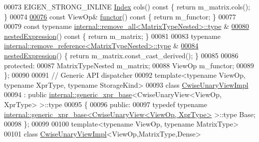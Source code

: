 \begin{DoxyCode}
00073     EIGEN\_STRONG\_INLINE \hyperlink{namespace_eigen_a62e77e0933482dafde8fe197d9a2cfde}{Index} cols()\textcolor{keyword}{ const }\{ \textcolor{keywordflow}{return} m\_matrix.cols(); \}
00074 
\hyperlink{group___core___module_af01271cdadcbcf195b5d3130ff2e1a48}{00076}     \textcolor{keyword}{const} ViewOp& \hyperlink{group___core___module_af01271cdadcbcf195b5d3130ff2e1a48}{functor}()\textcolor{keyword}{ const }\{ \textcolor{keywordflow}{return} m\_functor; \}
00077 
00079     \textcolor{keyword}{const} \textcolor{keyword}{typename} \hyperlink{group___sparse_core___module}{internal::remove\_all<MatrixTypeNested>::type}
      &
\hyperlink{group___core___module_a21d59e387e600b1d650cb002175760b4}{00080}     \hyperlink{group___core___module_a21d59e387e600b1d650cb002175760b4}{nestedExpression}()\textcolor{keyword}{ const }\{ \textcolor{keywordflow}{return} m\_matrix; \}
00081 
00083     \textcolor{keyword}{typename} \hyperlink{group___sparse_core___module}{internal::remove\_reference<MatrixTypeNested>::type}
      &
\hyperlink{group___core___module_add6689b53e595e968e89592ea30b6800}{00084}     \hyperlink{group___core___module_add6689b53e595e968e89592ea30b6800}{nestedExpression}() \{ \textcolor{keywordflow}{return} m\_matrix.const\_cast\_derived(); \}
00085 
00086   \textcolor{keyword}{protected}:
00087     MatrixTypeNested m\_matrix;
00088     ViewOp m\_functor;
00089 \};
00090 
00091 \textcolor{comment}{// Generic API dispatcher}
00092 \textcolor{keyword}{template}<\textcolor{keyword}{typename} ViewOp, \textcolor{keyword}{typename} XprType, \textcolor{keyword}{typename} StorageKind>
00093 \textcolor{keyword}{class }\hyperlink{class_eigen_1_1_cwise_unary_view_impl}{CwiseUnaryViewImpl}
00094   : \textcolor{keyword}{public} \hyperlink{struct_eigen_1_1internal_1_1generic__xpr__base}{internal::generic\_xpr\_base}<CwiseUnaryView<ViewOp, XprType> >::type
00095 \{
00096 \textcolor{keyword}{public}:
00097   \textcolor{keyword}{typedef} \textcolor{keyword}{typename} \hyperlink{struct_eigen_1_1internal_1_1generic__xpr__base}{internal::generic\_xpr\_base<CwiseUnaryView<ViewOp, XprType>}
       >::type Base;
00098 \};
00099 
00100 \textcolor{keyword}{template}<\textcolor{keyword}{typename} ViewOp, \textcolor{keyword}{typename} MatrixType>
00101 \textcolor{keyword}{class }\hyperlink{class_eigen_1_1_cwise_unary_view_impl}{CwiseUnaryViewImpl}<ViewOp,MatrixType,Dense>

\end{DoxyCode}
